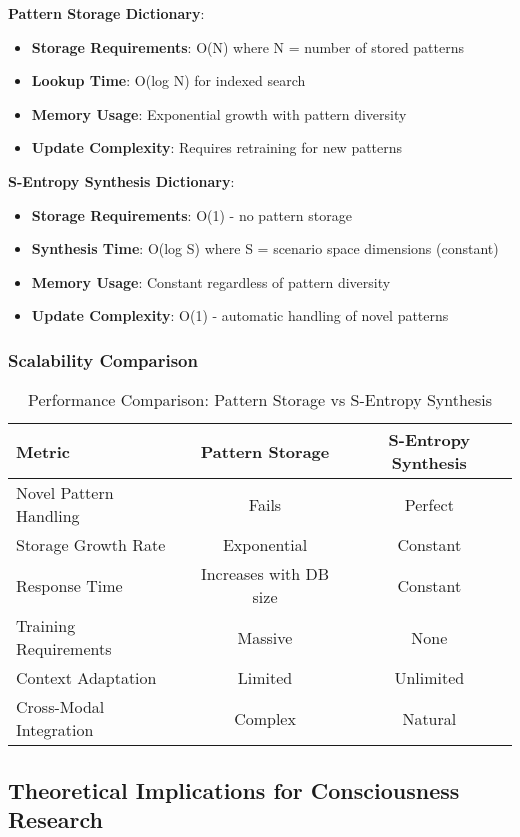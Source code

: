 \documentclass[12pt,a4paper]{article}
\begin{document}
\textbf{Pattern Storage Dictionary}:
\begin{itemize}
\item \textbf{Storage Requirements}: O(N) where N = number of stored patterns
\item \textbf{Lookup Time}: O(log N) for indexed search
\item \textbf{Memory Usage}: Exponential growth with pattern diversity
\item \textbf{Update Complexity}: Requires retraining for new patterns
\end{itemize}

\textbf{S-Entropy Synthesis Dictionary}:
\begin{itemize}
\item \textbf{Storage Requirements}: O(1) - no pattern storage
\item \textbf{Synthesis Time}: O(log S) where S = scenario space dimensions (constant)
\item \textbf{Memory Usage}: Constant regardless of pattern diversity
\item \textbf{Update Complexity}: O(1) - automatic handling of novel patterns
\end{itemize}

\subsubsection{Scalability Comparison}

\begin{table}[h]
\centering
\caption{Performance Comparison: Pattern Storage vs S-Entropy Synthesis}
\begin{tabular}{|l|c|c|}
\hline
\textbf{Metric} & \textbf{Pattern Storage} & \textbf{S-Entropy Synthesis} \\
\hline
Novel Pattern Handling & Fails & Perfect \\
Storage Growth Rate & Exponential & Constant \\
Response Time & Increases with DB size & Constant \\
Training Requirements & Massive & None \\
Context Adaptation & Limited & Unlimited \\
Cross-Modal Integration & Complex & Natural \\
\hline
\end{tabular}
\end{table}

\subsection{Theoretical Implications for Consciousness Research}
\end{document}
